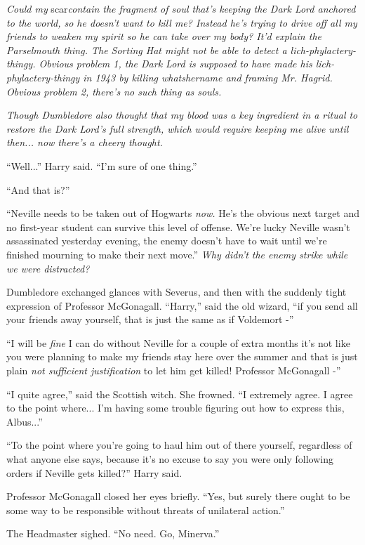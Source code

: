 \emph{Could my} scar\emph{contain the fragment of soul that's keeping
the Dark Lord anchored to the world, so he doesn't want to kill me?
Instead he's trying to drive off all my friends to weaken my spirit so
he can take over my body? It'd explain the Parselmouth thing. The
Sorting Hat might not be able to detect a lich-phylactery-thingy.
Obvious problem 1, the Dark Lord is supposed to have made his
lich-phylactery-thingy in 1943 by killing whatshername and framing Mr.
Hagrid. Obvious problem 2, there's no such thing as souls.}

\emph{Though Dumbledore also thought that my blood was a key ingredient
in a ritual to restore the Dark Lord's full strength, which would
require keeping me alive until then... now there's a cheery
thought.}

``Well...'' Harry said. ``I'm sure of one thing.''

``And that is?''

``Neville needs to be taken out of Hogwarts \emph{now.} He's the obvious
next target and no first-year student can survive this level of offense.
We're lucky Neville wasn't assassinated yesterday evening, the enemy
doesn't have to wait until we're finished mourning to make their next
move.'' \emph{Why didn't the enemy strike while we were distracted?}

Dumbledore exchanged glances with Severus, and then with the suddenly
tight expression of Professor McGonagall. ``Harry,'' said the old
wizard, ``if you send all your friends away yourself, that is just the
same as if Voldemort -''

``I will be \emph{fine} I can do without Neville for a couple of extra
months it's not like you were planning to make my friends stay here over
the summer and that is just plain \emph{not sufficient justification} to
let him get killed! Professor McGonagall -''

``I quite agree,'' said the Scottish witch. She frowned. ``I extremely
agree. I agree to the point where... I'm having some trouble
figuring out how to express this, Albus...''

``To the point where you're going to haul him out of there yourself,
regardless of what anyone else says, because it's no excuse to say you
were only following orders if Neville gets killed?'' Harry said.

Professor McGonagall closed her eyes briefly. ``Yes, but surely there
ought to be some way to be responsible without threats of unilateral
action.''

The Headmaster sighed. ``No need. Go, Minerva.''

